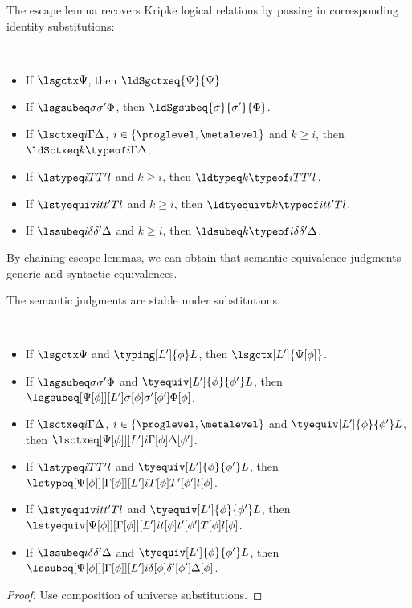 The escape lemma recovers Kripke logical relations by passing in corresponding
identity substitutions:
\begin{lemma}[Escape] $ $
  \begin{itemize}
  \item If $\lsgctx \Psi$, then $\ldSgctxeq{\Psi}{\Psi}$. 
  \item If $\lsgsubeq \sigma{\sigma'} \Phi$, then
    $\ldSgsubeq{\sigma}{\sigma'}{\Phi}$. 
  \item If $\lsctxeq i \Gamma\Delta$, $i \in \{\proglevel, \metalevel\}$ and $k \ge i$, then
    $\ldSctxeq k{\typeof i} {\Gamma}{\Delta}$.
  \item If $\lstypeq i T{T'} l$ and $k \ge i$, then $\ldtypeq k{\typeof i}{T}{T'}{l}$.
  \item If $\lstyequiv i t{t'} T l$ and $k \ge i$, then
    $\ldtyequivt k{\typeof i}{t}{t'}{T}{l}$.
  \item If $\lssubeq i \delta{\delta'}{\Delta}$ and $k \ge i$, then
    $\ldsubeq k{\typeof i} \delta{\delta'}{\Delta}$.
  \end{itemize}
\end{lemma}
By chaining escape lemmas, we can obtain that semantic equivalence judgments generic
and syntactic equivalences.

The semantic judgments are stable under substitutions.
\begin{lemma} $ $
  \begin{itemize}
  \item If $\lsgctx \Psi$ and $\typing[L']{\phi}L$, then $\lsgctx[L']{\Psi[\phi]}$.
  \item If $\lsgsubeq \sigma{\sigma'} \Phi$ and $\tyequiv[L']{\phi}{\phi'}L$, then
    $\lsgsubeq[\Psi[\phi]][L']{\sigma[\phi]}{\sigma'[\phi']}{\Phi[\phi]}$.
  \item If $\lsctxeq i \Gamma\Delta$, $i \in \{\proglevel, \metalevel\}$ and $\tyequiv[L']{\phi}{\phi'}L$, then
    $\lsctxeq[\Psi[\phi]][L'] i{\Gamma[\phi]}{\Delta[\phi']}$.
  \item If $\lstypeq i T{T'} l$ and $\tyequiv[L']{\phi}{\phi'}L$, then
    $\lstypeq[\Psi[\phi]][\Gamma[\phi]][L'] i{T[\phi]}{T'[\phi']}{l[\phi]}$.
  \item If $\lstyequiv i t{t'} T l$ and $\tyequiv[L']{\phi}{\phi'}L$,
    then
    $\lstyequiv[\Psi[\phi]][\Gamma[\phi]][L'] i{t[\phi]}{t'[\phi']}{T[\phi]}{l[\phi]}$.
  \item If $\lssubeq i \delta{\delta'}{\Delta}$ and $\tyequiv[L']{\phi}{\phi'}L$, then
    $\lssubeq[\Psi[\phi]][\Gamma[\phi]][L'] i{\delta[\phi]}{\delta'[\phi']}{\Delta[\phi]}$.
  \end{itemize}  
\end{lemma}
\begin{proof}
  Use composition of universe substitutions.
\end{proof}

